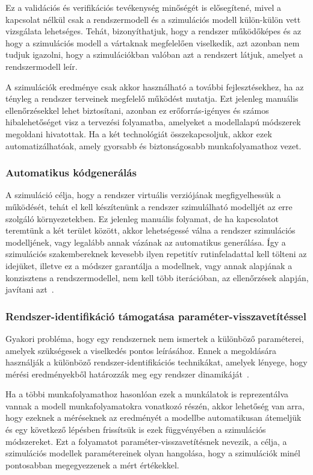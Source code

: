         Ez a validációs és verifikációs tevékenység minőségét is elősegítené, mivel a kapcsolat nélkül csak a rendszermodell és a szimulációs modell külön-külön vett vizsgálata lehetséges.
        Tehát, bizonyíthatjuk, hogy a rendszer működőképes és az hogy a szimulációs modell a vártaknak megfelelően viselkedik, azt azonban nem tudjuk igazolni, hogy a szimulációkban valóban azt a rendszert látjuk, amelyet a rendszermodell leír.
        
        A szimulációk eredménye csak akkor használható a további fejlesztésekhez, ha az tényleg a rendszer terveinek megfelelő működést mutatja.
        Ezt jelenleg manuális ellenőrzésekkel lehet biztosítani, azonban ez erőforrás-igényes és számos hibalehetőséget visz a tervezési folyamatba, amelyeket a modellalapú módszerek megoldani hivatottak.
        Ha a két technológiát összekapcsoljuk, akkor ezek automatizálhatóak, amely gyorsabb és biztonságosabb munkafolyamathoz vezet.

        \subsubsection{Automatikus kódgenerálás}
        A szimuláció célja, hogy a rendszer virtuális verziójának megfigyelhessük a működését, tehát el kell készítenünk a rendszer szimulálható modelljét az erre szolgáló környezetekben.
        Ez jelenleg manuális folyamat, de ha kapcsolatot teremtünk a két terület között, akkor lehetségessé válna a rendszer szimulációs modelljének, vagy legalább annak vázának az automatikus generálása.
        Így a szimulációs szakembereknek kevesebb ilyen repetitív rutinfeladattal kell tölteni az idejüket, illetve ez a módszer garantálja a modellnek, vagy annak alapjának a konzisztens a rendszermodellel, nem kell több iterációban, az ellenőrzések alapján, javítani azt~\cite{Ma_2022}.

        \subsubsection{Rendszer-identifikáció támogatása paraméter-visszavetítéssel}
        Gyakori probléma, hogy egy rendszernek nem ismertek a különböző paraméterei, amelyek szükségesek a viselkedés pontos leírásához.
        Ennek a megoldására használják a különböző rendszer-identifikációs technikákat, amelyek lényege, hogy mérési eredményekből határozzák meg egy rendszer dinamikáját~\cite{Mathworks}.

        Ha a többi munkafolyamathoz hasonlóan ezek a munkálatok is reprezentálva vannak a modell munkafolyamatokra vonatkozó részén, akkor lehetőség van arra,
        hogy ezeknek a méréseknek az eredményét a modellbe automatikusan átemeljük és egy következő lépésben frissítsük is ezek függvényében a szimulációs módszereket.
        Ezt a folyamatot paraméter-visszavetítésnek nevezik, a célja, a szimulációs modellek paramétereinek olyan hangolása, hogy a szimulációk minél pontosabban megegyezzenek a mért értékekkel.

